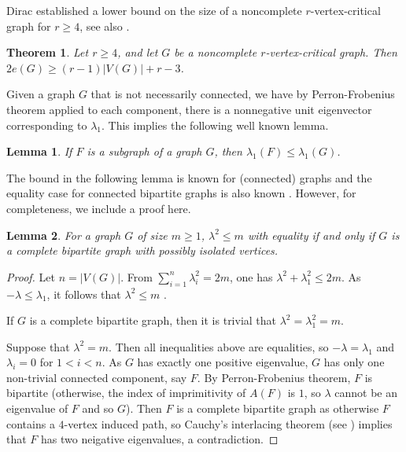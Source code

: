 \documentclass[12pt]{article}
\newtheorem{theorem}{Theorem}%
\newtheorem{lemma}{Lemma}[section]
\begin{document}
Dirac  established a lower bound  on the size of a noncomplete $r$-vertex-critical graph for $r\ge 4$, see also \cite{BernshteynKostochka}.

\begin{theorem}\label{thm:dirac} \cite[Theorem 15]{Dirac}
Let $r\ge 4$, and let $G$ be a noncomplete $r$-vertex-critical graph. Then
$2e(G)\ge (r-1)|V(G)|+r-3$.
\end{theorem}

Given a graph $G$ that is not necessarily connected, we have by Perron-Frobenius theorem applied to each component, there is a nonnegative unit eigenvector corresponding to $\lambda_1$.
This implies the following well known lemma.

\begin{lemma}\label{subgraph}
If $F$ is a subgraph of a graph $G$, then $\lambda_1(F)\le \lambda_1(G)$.
\end{lemma}

The bound in the following lemma is known for (connected) graphs \cite{Powers}  and the equality case for connected bipartite graphs is also known \cite{HS}. However, for completeness, we include a proof here.


\begin{lemma} \label{BIS}
For a graph $G$ of size $m\ge 1$, $\lambda^2\le m$ with equality if and only if $G$ is a complete bipartite graph with possibly isolated vertices.
\end{lemma}

\begin{proof} 
Let $n=|V(G)|$. From $\sum_{i=1}^n\lambda_i^2=2m$, one has $\lambda^2+\lambda_1^2\le 2m$. As $-\lambda \le \lambda_1$, it follows that $\lambda^2\le m$ \cite{Powers}.

If $G$ is a complete bipartite graph, then it is trivial that  $\lambda^2=\lambda_1^2=m$.

Suppose that $\lambda^2=m$. Then all inequalities above are equalities, so $-\lambda=\lambda_1$ and $\lambda_i=0$ for $1<i<n$. As $G$ has exactly one positive eigenvalue, $G$ has only one non-trivial connected component, say $F$. By Perron-Frobenius theorem, $F$ is bipartite (otherwise, the index of imprimitivity of $A(F)$ is $1$, so $\lambda$ cannot be an eigenvalue of $F$ and so $G$). 
Then $F$ is a complete bipartite graph as otherwise $F$ contains a $4$-vertex induced path, so Cauchy's interlacing theorem (see \cite[Theorem 0.10]{CDS}) implies that  $F$ has two neigative eigenvalues, a contradiction.
\end{proof}
\end{document}
